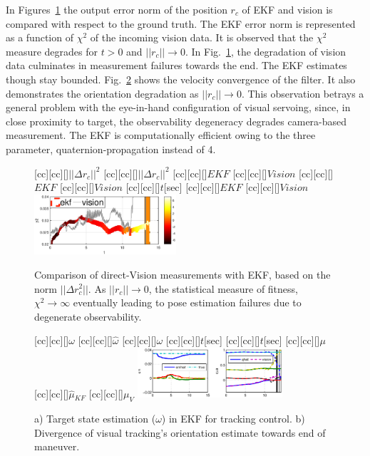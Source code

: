 In Figures~\ref{fig:fig_norm_errors} the output error norm of the position $r_c$ of EKF and vision is compared with respect to the ground truth. The EKF error norm is represented as a function  of $\chi^2$ of the incoming vision data. It is observed that the $\chi^2$ measure degrades for $t > 0 $ and $||r_c|| \rightarrow 0 $. In Fig.~\ref{fig:fig_norm_errors}, the degradation of vision data culminates in measurement failures towards the end. The EKF estimates though stay bounded. Fig.~\ref{fig:states_EKF} shows the velocity convergence of the filter. It also demonstrates the orientation degradation as $||r_c|| \rightarrow 0$. This observation betrays a general problem with the eye-in-hand configuration of visual servoing, since, in close proximity to target, the observability degeneracy degrades camera-based measurement. The EKF is computationally efficient owing to the three parameter, quaternion-propagation instead of 4. 
%
\begin{figure}[t!]
[cc][cc][\FontFigB]{$||\Delta r_c||^2$}
[cc][cc][\FontFigB]{$||\Delta r_c||^2$}
[cc][cc][\FontFigM]{$EKF$}
[cc][cc][\FontFigM]{$Vision$}
[cc][cc][\FontFigM]{$EKF$}
[cc][cc][\FontFigM]{$Vision$}
[cc][cc][\FontFigB]{$t$[sec]}
[cc][cc][\FontFigM]{$EKF$}
[cc][cc][\FontFigM]{$Vision$}
\centering\includegraphics[angle=0,width=0.47\textwidth]{./figures/fig_norm_errors}
\caption{Comparison of direct-Vision measurements with EKF, based on the norm $||\Delta r_c^2||$. As $||r_c|| \rightarrow 0$, the statistical measure of fitness, $\chi^2 \rightarrow \infty $ eventually leading to pose estimation failures due to degenerate observability.}
\label{fig:fig_norm_errors}
\end{figure}
%
%
\begin{figure}[t!]
[cc][cc][\FontFigB]{$\omega$}
[cc][cc][\FontFigB]{$\hat{\omega}$}
[cc][cc][\FontFigB]{$\omega$}
[cc][cc][\FontFigB]{$t$[sec]}
[cc][cc][\FontFigB]{$t$[sec]}
[cc][cc][\FontFigB]{$\mu$}
[cc][cc][\FontFigB]{$\hat{\mu}{}_{KF}$}
[cc][cc][\FontFigB]{$\mu_V$}
\centering\includegraphics[angle=0,width=0.48\textwidth]{./figures/states_EKF}
\caption{a) Target state estimation ($\omega$) in EKF for tracking control. b) Divergence of visual tracking's orientation estimate towards end of maneuver.}
\label{fig:states_EKF}
\end{figure}
%

